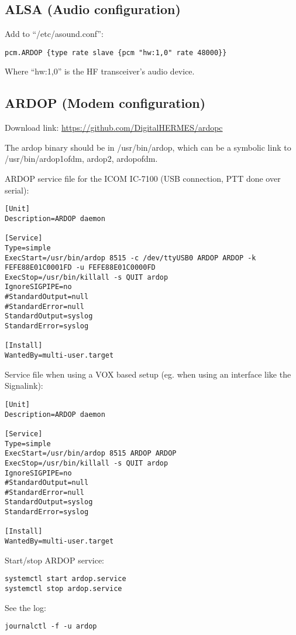 \documentclass[11pt,a4paper]{article}
\begin{document}
\subsection{ALSA (Audio configuration)}

Add to ``/etc/asound.conf'':
\begin{verbatim}
pcm.ARDOP {type rate slave {pcm "hw:1,0" rate 48000}}
\end{verbatim}

Where ``hw:1,0'' is the HF transceiver's audio device.

\subsection{ARDOP (Modem configuration)}

Download link: \url{https://github.com/DigitalHERMES/ardopc}

The ardop binary should be in /usr/bin/ardop, which can be a
symbolic link to /usr/bin/{ardop1ofdm, ardop2, ardopofdm}.

ARDOP service file for the ICOM IC-7100 (USB connection, PTT done over serial):
\begin{verbatim}
[Unit]
Description=ARDOP daemon

[Service]
Type=simple
ExecStart=/usr/bin/ardop 8515 -c /dev/ttyUSB0 ARDOP ARDOP -k FEFE88E01C0001FD -u FEFE88E01C0000FD
ExecStop=/usr/bin/killall -s QUIT ardop
IgnoreSIGPIPE=no
#StandardOutput=null
#StandardError=null
StandardOutput=syslog
StandardError=syslog

[Install]
WantedBy=multi-user.target
\end{verbatim}

Service file when using a VOX based setup (eg. when using an interface like
the Signalink):
\begin{verbatim}
[Unit]
Description=ARDOP daemon

[Service]
Type=simple
ExecStart=/usr/bin/ardop 8515 ARDOP ARDOP
ExecStop=/usr/bin/killall -s QUIT ardop
IgnoreSIGPIPE=no
#StandardOutput=null
#StandardError=null
StandardOutput=syslog
StandardError=syslog

[Install]
WantedBy=multi-user.target
\end{verbatim}


Start/stop ARDOP service:
\begin{verbatim}
systemctl start ardop.service
systemctl stop ardop.service
\end{verbatim}


See the log:
\begin{verbatim}
journalctl -f -u ardop
\end{verbatim}
\end{document}

